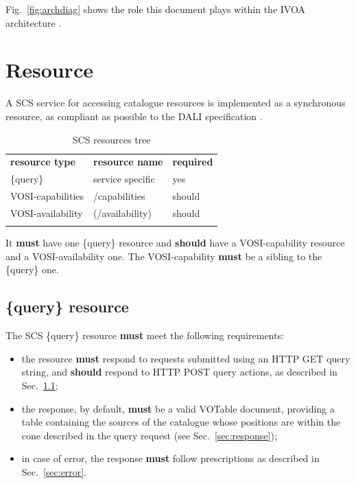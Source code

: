 \documentclass[11pt,a4paper]{ivoa}
\begin{document}
Fig.~\ref{fig:archdiag} shows the role this document plays within the
IVOA architecture \citep{note:VOARCH}.

\section{Resource}
\label{sec:resif}

A SCS service for accessing catalogue resources is implemented as a synchronous resource, as compliant as possible to the DALI specification \citep{std:DALI}.

\begin{table}[th]
\begin{center}
\begin{tabular}{p{}p{}p{}}
\sptablerule
\textbf{resource type}&\textbf{resource name}&\textbf{required}\\
\sptablerule
\{query\} & service specific & yes\\
VOSI-capabilities & /capabilities & should\\
VOSI-availability & (/availability) & should\\
\sptablerule
\label{table:resources}
\end{tabular}
\caption{SCS resources tree}
\end{center}
\end{table}

It \textbf{must} have one \{query\} resource and \textbf{should} have a VOSI-capability resource and a VOSI-availability one. The VOSI-capability \textbf{must} be a sibling to the \{query\} one.

\subsection{\{query\} resource}
\label{sec:basepar}
The SCS \{query\} resource \textbf{must} meet the following requirements:
\begin{itemize}
	\item the resource \textbf{must} respond to requests submitted using an HTTP GET query string, and \textbf{should} respond to HTTP POST query actions, as described in Sec.~\ref{sec:basepar};
	\item the response, by default, \textbf{must} be a valid VOTable document, providing a table containing the sources of the catalogue whose positions are within the cone described in the query request (see Sec.~\ref{sec:response});
	\item in case of error, the response \textbf{must} follow prescriptions as described in Sec.~\ref{sec:error}.
\end{itemize}
\end{document}
